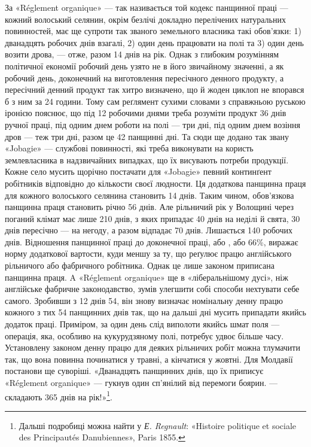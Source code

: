 За «Réglement organique» — так називається той кодекс панщинної
праці — кожний волоський селянин, окрім безлічі докладно
перелічених натуральних повинностей, має ще супроти так
званого земельного власника такі обов’язки: 1) дванадцять робочих
днів взагалі, 2) один день працювати на полі та 3) один день
возити дрова, — отже, разом 14 днів на рік. Однак з глибоким розумінням
політичної економії робочий день узято не в його звичайному
значенні, а як робочий день, доконечний на виготовлення
пересічного денного продукту, а пересічний денний продукт так
хитро визначено, що й жоден циклоп не впорався б з ним за
24 години. Тому сам реґлямент сухими словами з справжньою
руською іронією пояснює, що під 12 робочими днями треба розуміти
продукт 36 днів ручної праці, під одним днем роботи на полі —
три дні, під одним днем возіння дров — теж три дні, разом це
42 панщинні дні. Та сюди ще додано так звану «Jobagie» — службові
повинності, які треба виконувати на користь землевласника
в надзвичайних випадках, що їх висувають потреби продукції.
Кожне село мусить щорічно постачати для «Jobagie» певний
континґент робітників відповідно до кількости своєї людности.
Ця додаткова панщинна праця для кожного волоського селянина
становить 14 днів. Таким чином, обов’язкова панщинна праця
становить річно 56 днів. Але рільничий рік у Волощині через
поганий клімат має лише 210 днів, з яких припадає 40 днів на
неділі й свята, 30 днів пересічно — на негоду, а разом відпадає
70 днів. Лишається 140 робочих днів. Відношення панщинної
праці до доконечної праці, або , або 66\%, виражає норму додаткової
вартости, куди меншу за ту, що реґулює працю англійського
рільничого або фабричного робітника. Однак це лише
законом приписана панщинна праця. A «Réglement organique»
ще в «ліберальнішому дусі», ніж англійське фабричне законодавство,
зумів улегшити собі способи нехтувати себе самого.
Зробивши з 12 днів 54, він знову визначає номінальну денну працю
кожного з тих 54 панщинних днів так, що на дальші дні мусить
припадати якийсь додаток праці. Приміром, за один день слід
виполоти якийсь шмат поля — операція, яка, особливо на кукурудзяному
полі, потребує удвоє більше часу. Установлену законом
денну працю для деяких рільничих робіт можна тлумачити
так, що вона повинна починатися у травні, а кінчатися у жовтні.
Для Молдавії постанови ще суворіші. «Дванадцять панщинних
днів, що їх приписує «Réglement organique» — гукнув один
сп’янілий від перемоги боярин. — складають 365 днів на рік!»\footnote{
Дальші подробиці можна найти у \emph{Е. Regnault}: «Histoire politique
et sociale des Principautés Danubiennes», Paris 1855.
}.

